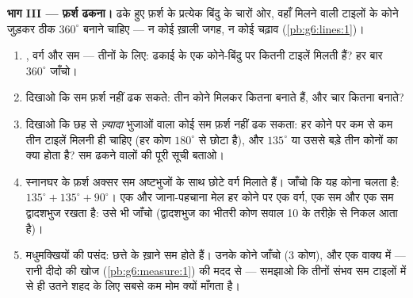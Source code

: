 \begin{problem}
\medskip
\noindent\textbf{भाग III --- फ़र्श ढकना।}
ढके हुए फ़र्श के प्रत्येक बिंदु के चारों ओर, वहाँ मिलने वाली टाइलों
के कोने जुड़कर ठीक $360^\circ$ बनाने चाहिए --- न कोई ख़ाली जगह, न
कोई चढ़ाव (\cref{pb:g6:lines:1})।
\begin{enumerate}[resume]
  \item {}, वर्ग और सम  --- तीनों के लिए: ढकाई
        के एक कोने-बिंदु पर कितनी टाइलें मिलती हैं? हर बार
        $360^\circ$ जाँचो।
  \item दिखाओ कि सम  फ़र्श नहीं ढक सकते: तीन कोने मिलकर
        कितना बनाते हैं, और चार कितना बनाते?
  \item दिखाओ कि छह से \emph{ज़्यादा} भुजाओं वाला कोई सम 
        फ़र्श नहीं ढक सकता: हर कोने पर कम से कम तीन टाइलें मिलनी
        ही चाहिए (हर कोण $180^\circ$ से छोटा है), और $135^\circ$
        या उससे बड़े तीन कोनों का क्या होता है? सम ढकने वालों की
        पूरी सूची बताओ।
  \item स्नानघर के फ़र्श अक्सर सम अष्टभुजों के साथ छोटे वर्ग
        मिलाते हैं। जाँचो कि यह कोना चलता है:
        $135^\circ + 135^\circ + 90^\circ$। एक और जाना-पहचाना
        मेल हर कोने पर एक वर्ग, एक सम  और एक सम द्वादशभुज
        रखता है: उसे भी जाँचो (द्वादशभुज का भीतरी कोण सवाल 10 के
        तरीक़े से निकल आता है)।
  \item मधुमक्खियों की पसंद: छत्ते के ख़ाने सम  होते हैं।
        उनके कोने जाँचो ($3$ कोण), और एक वाक्य में --- रानी दीदो
        की खोज (\cref{pb:g6:measure:1}) की मदद से --- समझाओ कि
        तीनों संभव सम टाइलों में से  ही उतने शहद के लिए
        सबसे कम मोम क्यों माँगता है।
\end{enumerate}
\end{problem}
